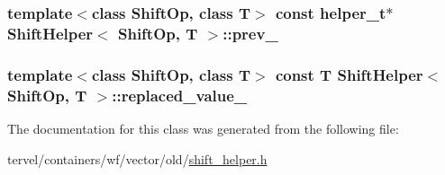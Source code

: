 \subsubsection[{prev\+\_\+}]{\setlength{\rightskip}{0pt plus 5cm}template$<$class Shift\+Op, class T$>$ const {\bf helper\+\_\+t}$\ast$ {\bf Shift\+Helper}$<$ Shift\+Op, T $>$\+::prev\+\_\+}\label{class_shift_helper_a78998ae32b1b34120e66ab954a5faeca}
\hypertarget{class_shift_helper_ad138be20f4364f297e3c809eda6136c4}{}
\subsubsection[{replaced\+\_\+value\+\_\+}]{\setlength{\rightskip}{0pt plus 5cm}template$<$class Shift\+Op, class T$>$ const T {\bf Shift\+Helper}$<$ Shift\+Op, T $>$\+::replaced\+\_\+value\+\_\+}\label{class_shift_helper_ad138be20f4364f297e3c809eda6136c4}


The documentation for this class was generated from the following file\+:\begin{DoxyCompactItemize}
\item 
tervel/containers/wf/vector/old/\hyperlink{shift__helper_8h}{shift\+\_\+helper.\+h}\end{DoxyCompactItemize}
